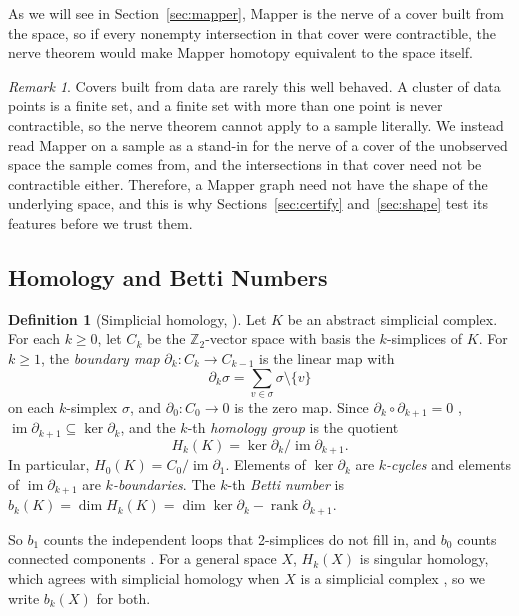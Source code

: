 \documentclass[11pt]{article}
\newcommand{\Z}{\mathbb{Z}}
\DeclareMathOperator{\rank}{rank}
\theoremstyle{definition}
\newtheorem{definition}[theorem]{Definition}
\theoremstyle{remark}
\newtheorem{remark}[theorem]{Remark}
\begin{document}
As we will see in Section~\ref{sec:mapper}, Mapper is the nerve of a cover built from the space, so if every nonempty intersection in that cover were contractible, the nerve theorem would make Mapper homotopy equivalent to the space itself.

\begin{remark}
Covers built from data are rarely this well behaved. A cluster of data points is a finite set, and a finite set with more than one point is never contractible, so the nerve theorem cannot apply to a sample literally. We instead read Mapper on a sample as a stand-in for the nerve of a cover of the unobserved space the sample comes from, and the intersections in that cover need not be contractible either. Therefore, a Mapper graph need not have the shape of the underlying space, and this is why Sections~\ref{sec:certify} and~\ref{sec:shape} test its features before we trust them.
\end{remark}

\subsection{Homology and Betti Numbers}\label{sec:homology}
\begin{definition}[Simplicial homology, {\cite{hatcher2001}}]
Let $K$ be an abstract simplicial complex. For each $k \ge 0$, let $C_k$ be the $\Z_2$-vector space with basis the $k$-simplices of $K$.
For $k \ge 1$, the \emph{boundary map} $\partial_k : C_k \to C_{k-1}$ is the linear map with
\[
  \partial_k \sigma = \sum_{v \in \sigma} \sigma \setminus \{v\}
\]
on each $k$-simplex $\sigma$, and $\partial_0 : C_0 \to 0$ is the zero map.
Since $\partial_k \circ \partial_{k+1} = 0$ \parencite[Lemma~2.1]{hatcher2001}, $\operatorname{im} \partial_{k+1} \subseteq \ker \partial_k$, and the $k$-th \emph{homology group} is the quotient
\[
  H_k(K) = \ker \partial_k / \operatorname{im} \partial_{k+1}.
\]
In particular, $H_0(K) = C_0 / \operatorname{im} \partial_1$.
Elements of $\ker \partial_k$ are \emph{$k$-cycles} and elements of $\operatorname{im} \partial_{k+1}$ are \emph{$k$-boundaries}.
The $k$-th \emph{Betti number} is $b_k(K) = \dim H_k(K) = \dim \ker \partial_k - \rank \partial_{k+1}$.
\end{definition}
So $b_1$ counts the independent loops that 2-simplices do not fill in, and $b_0$ counts connected components \parencite[Prop.~2.7]{hatcher2001}.
For a general space $X$, $H_k(X)$ is singular homology, which agrees with simplicial homology when $X$ is a simplicial complex \parencite[Thm.~2.27 and p.~153]{hatcher2001}, so we write $b_k(X)$ for both.
\end{document}
